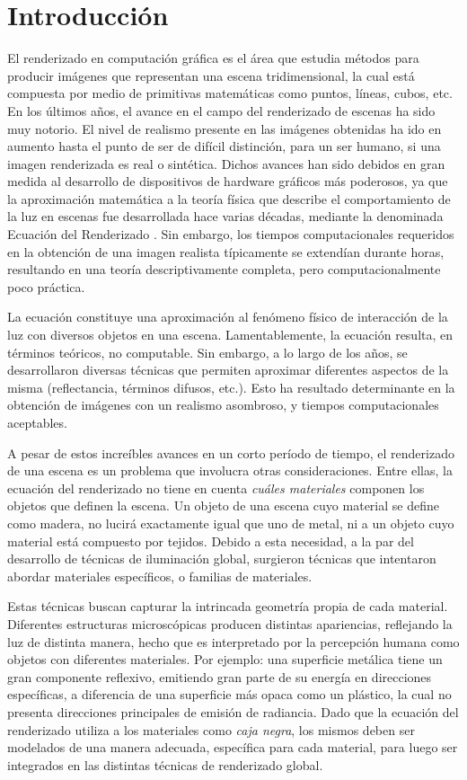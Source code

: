 \chapter{Introducción}
El renderizado en computación gráfica es el área que estudia métodos para producir imágenes que representan una escena tridimensional, la cual está compuesta por medio de primitivas matemáticas como puntos, líneas, cubos, etc.
En los últimos años, el avance en el campo del renderizado de escenas ha sido muy notorio. 
El nivel de realismo presente en las imágenes obtenidas ha ido en aumento hasta el punto de ser de difícil distinción, para un ser humano, si una imagen renderizada es real o sintética.
Dichos avances han sido debidos en gran medida al desarrollo de dispositivos de hardware gráficos más poderosos, ya que la aproximación matemática a la teoría física que describe el comportamiento de la luz en escenas fue desarrollada hace varias décadas, mediante la denominada Ecuación del Renderizado \cite{Kajiya1986}.
Sin embargo, los tiempos computacionales requeridos en la obtención de una imagen realista típicamente se extendían durante horas, resultando en una teoría descriptivamente completa, pero computacionalmente poco práctica. 

La ecuación constituye una aproximación al fenómeno físico de interacción de la luz con diversos objetos en una escena.
Lamentablemente, la ecuación resulta, en términos teóricos, no computable.
Sin embargo, a lo largo de los años, se desarrollaron diversas técnicas que permiten aproximar diferentes aspectos de la misma (reflectancia, términos difusos, etc.).
Esto ha resultado determinante en la obtención de imágenes con un realismo asombroso, y tiempos computacionales aceptables.

A pesar de estos increíbles avances en un corto período de tiempo, el renderizado de una escena es un problema que involucra otras consideraciones.
Entre ellas, la ecuación del renderizado no tiene en cuenta {\em cuáles materiales} componen los objetos que definen la escena.
Un objeto de una escena cuyo material se define como madera, no lucirá exactamente igual que uno de metal, ni a un objeto cuyo material está compuesto por tejidos.
Debido a esta necesidad, a la par del desarrollo de técnicas de iluminación global, surgieron técnicas que intentaron abordar materiales específicos, o familias de materiales.

Estas técnicas buscan capturar la intrincada geometría propia de cada material.
Diferentes estructuras microscópicas producen distintas apariencias, reflejando la luz de distinta manera, hecho que es interpretado por la percepción humana como objetos con diferentes materiales.
Por ejemplo: una superficie metálica tiene un gran componente reflexivo, emitiendo gran parte de su energía en direcciones específicas, a diferencia de una superficie más opaca como un plástico, la cual no presenta direcciones principales de emisión de radiancia.
Dado que la ecuación del renderizado utiliza a los materiales como {\em caja negra}, los mismos deben ser modelados de una manera adecuada, específica para cada material, para luego ser integrados en las distintas técnicas de renderizado global.


